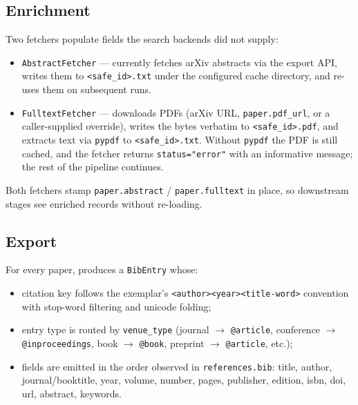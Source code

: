 \documentclass[
]{article}
\providecommand{\tightlist}{%
  \setlength{\itemsep}{0pt}\setlength{\parskip}{0pt}}
\begin{document}
\subsection{Enrichment}\label{enrichment}

Two fetchers populate fields the search backends did not supply:

\begin{itemize}
\tightlist
\item
  \texttt{AbstractFetcher} --- currently fetches arXiv abstracts via the
  export API, writes them to
  \texttt{\textless{}safe\_id\textgreater{}.txt} under the configured
  cache directory, and re-uses them on subsequent runs.
\item
  \texttt{FulltextFetcher} --- downloads PDFs (arXiv URL,
  \texttt{paper.pdf\_url}, or a caller-supplied override), writes the
  bytes verbatim to \texttt{\textless{}safe\_id\textgreater{}.pdf}, and
  extracts text via \texttt{pypdf} to
  \texttt{\textless{}safe\_id\textgreater{}.txt}. Without \texttt{pypdf}
  the PDF is still cached, and the fetcher returns
  \texttt{status="error"} with an informative message; the rest of the
  pipeline continues.
\end{itemize}

Both fetchers stamp \texttt{paper.abstract} / \texttt{paper.fulltext} in
place, so downstream stages see enriched records without re-loading.

\subsection{Export}\label{export}

For every paper,  produces a
\texttt{BibEntry} whose:

\begin{itemize}
\tightlist
\item
  citation key follows the exemplar's
  \texttt{\textless{}author\textgreater{}\textless{}year\textgreater{}\textless{}title-word\textgreater{}}
  convention with stop-word filtering and unicode folding;
\item
  entry type is routed by \texttt{venue\_type} (journal \texorpdfstring{\ensuremath{\to}}{->}
  \texttt{@article}, conference \texorpdfstring{\ensuremath{\to}}{->} \texttt{@inproceedings}, book \texorpdfstring{\ensuremath{\to}}{->}
  \texttt{@book}, preprint \texorpdfstring{\ensuremath{\to}}{->} \texttt{@article}, etc.);
\item
  fields are emitted in the order observed in \texttt{references.bib}:
  title, author, journal/booktitle, year, volume, number, pages,
  publisher, edition, isbn, doi, url, abstract, keywords.
\end{itemize}
\end{document}
